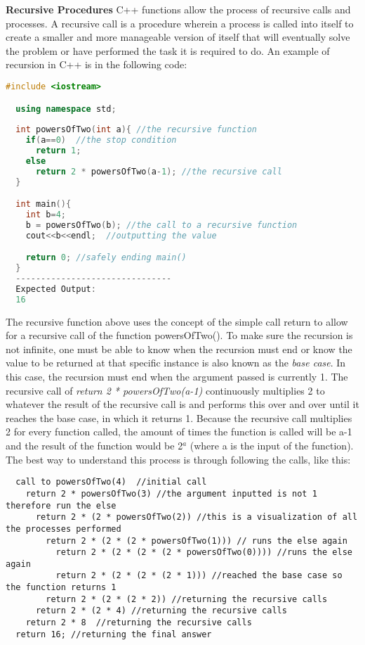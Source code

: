 \documentclass[12pt]{article}
\begin{document}
\textbf{Recursive Procedures} C++ functions allow the process of recursive calls and processes. A recursive call is a procedure wherein a process is called into itself to create a smaller and more manageable version of itself that will eventually solve the problem or have performed the task it is required to do. An example of recursion in C++ is in the following code:

\begin{lstlisting}[language=C++]
  #include <iostream>

  using namespace std;
  
  int powersOfTwo(int a){ //the recursive function
    if(a==0)  //the stop condition
      return 1;
    else
      return 2 * powersOfTwo(a-1); //the recursive call
  }

  int main(){
    int b=4;
    b = powersOfTwo(b); //the call to a recursive function
    cout<<b<<endl;  //outputting the value 

    return 0; //safely ending main()
  }
  -------------------------------
  Expected Output:
  16
\end{lstlisting}
The recursive function above uses the concept of the simple call return to allow for a recursive call of the function powersOfTwo(). To make sure the recursion is not infinite, one must be able to know when the recursion must end or know the value to be returned at that specific instance is also known as the \textit{base case}. In this case, the recursion must end when the argument passed is currently 1. The recursive call of \textit{return 2 * powersOfTwo(a-1)} continuously multiplies 2 to whatever the result of the recursive call is and performs this over and over until it reaches the base case, in which it returns 1. Because the recursive call multiplies 2 for every function called, the amount of times the function is called will be a-1 and the result of the function would be 2$^a$ (where a is the input of the function). The best way to understand this process is through following the calls, like this:
\begin{lstlisting}
  call to powersOfTwo(4)  //initial call
    return 2 * powersOfTwo(3) //the argument inputted is not 1 therefore run the else
      return 2 * (2 * powersOfTwo(2)) //this is a visualization of all the processes performed
        return 2 * (2 * (2 * powersOfTwo(1))) // runs the else again
          return 2 * (2 * (2 * (2 * powersOfTwo(0)))) //runs the else again
          return 2 * (2 * (2 * (2 * 1))) //reached the base case so the function returns 1
        return 2 * (2 * (2 * 2)) //returning the recursive calls
      return 2 * (2 * 4) //returning the recursive calls
    return 2 * 8  //returning the recursive calls
  return 16; //returning the final answer
\end{lstlisting}
\end{document}
